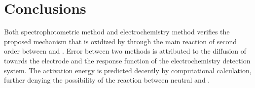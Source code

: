 \documentclass[%
preprint,
 amsmath,amssymb,
 aps,
10.5pt,
]{revtex4-1}
\begin{document}
\section{Conclusions}
Both spectrophotometric method and electrochemistry method verifies the proposed mechanism that  is oxidized by  through the main reaction of second order between  and . Error between two methods is attributed to the diffusion of  towards the electrode and the response function of the electrochemistry detection system. The activation energy is predicted decently by computational calculation, further denying the possibility of the reaction between neutral  and .

\end{document}
